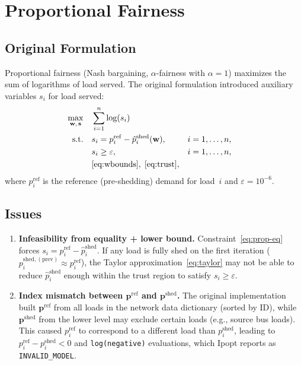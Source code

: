 \documentclass[11pt]{article}
\begin{document}
\section{Proportional Fairness}\label{sec:proportional}

\subsection{Original Formulation}

Proportional fairness (Nash bargaining, $\alpha$-fairness with $\alpha=1$) maximizes the sum of logarithms of load served.
The original formulation introduced auxiliary variables $s_i$ for load served:
\begin{align}
    \max_{\mathbf{w},\,\mathbf{s}} \quad & \sum_{i=1}^{n} \log(s_i) \\
    \text{s.t.} \quad
    & s_i = p_i^{\mathrm{ref}} - \hat{p}_i^{\mathrm{shed}}(\mathbf{w}), & i &= 1,\dots,n, \label{eq:prop-eq}\\
    & s_i \ge \varepsilon, & i &= 1,\dots,n, \label{eq:prop-lb}\\
    & \eqref{eq:wbounds},\;\eqref{eq:trust}, \notag
\end{align}
where $p_i^{\mathrm{ref}}$ is the reference (pre-shedding) demand for load~$i$ and $\varepsilon = 10^{-6}$.

\subsection{Issues}

\begin{enumerate}
    \item \textbf{Infeasibility from equality + lower bound.}
    Constraint~\eqref{eq:prop-eq} forces $s_i = p_i^{\mathrm{ref}} - \hat{p}_i^{\mathrm{shed}}$.
    If any load is fully shed on the first iteration ($p_i^{\mathrm{shed,(prev)}} \approx p_i^{\mathrm{ref}}$), the Taylor approximation~\eqref{eq:taylor} may not be able to reduce $\hat{p}_i^{\mathrm{shed}}$ enough within the trust region to satisfy $s_i \ge \varepsilon$.

    \item \textbf{Index mismatch between $\mathbf{p}^{\mathrm{ref}}$ and $\mathbf{p}^{\mathrm{shed}}$.}
    The original implementation built $\mathbf{p}^{\mathrm{ref}}$ from all loads in the network data dictionary (sorted by ID), while $\mathbf{p}^{\mathrm{shed}}$ from the lower level may exclude certain loads (e.g., source bus loads).
    This caused $p_i^{\mathrm{ref}}$ to correspond to a different load than $p_i^{\mathrm{shed}}$, leading to $p_i^{\mathrm{ref}} - p_i^{\mathrm{shed}} < 0$ and \texttt{log(negative)} evaluations, which Ipopt reports as \texttt{INVALID\_MODEL}.
\end{enumerate}
\end{document}
